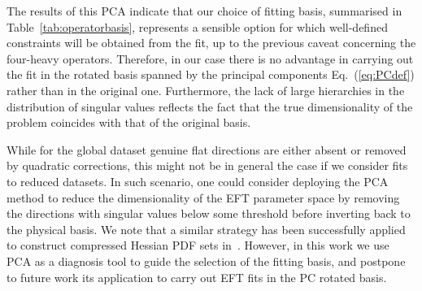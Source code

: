 The results of this PCA indicate that
our choice of fitting basis,
summarised in Table~\ref{tab:operatorbasis}, represents a sensible option
for which well-defined constraints will be obtained from the fit,
up to the previous caveat concerning the four-heavy operators.
%
Therefore, in our case there is no advantage in carrying out
the fit in the rotated basis spanned by the principal components
 Eq.~(\ref{eq:PCdef}) rather than in the original one.
%
Furthermore, the lack of large hierarchies in the distribution of singular values
reflects the fact that the true dimensionality of the problem coincides with that
of the original basis.

While for the global dataset genuine flat directions are either absent or removed by quadratic
corrections, this might not be in general the case if we consider
fits to reduced datasets.
%
In such scenario, one could consider deploying the PCA method to reduce the dimensionality
of the EFT parameter space by removing the directions with singular values below
some threshold before inverting back to the physical basis.
%
We note that a similar strategy has been successfully applied to
construct compressed Hessian PDF sets in~\cite{Carrazza:2015aoa,Carrazza:2016htc}.
%
However, in this work we use PCA as a diagnosis tool to guide
the selection of the fitting basis,
and postpone to future work its application to carry out EFT fits
in the PC rotated basis.




